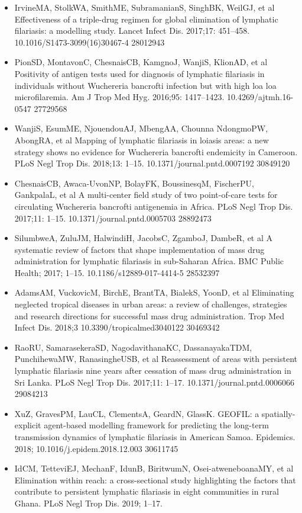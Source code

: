 \documentclass[11pt,a4paper]{article}
\begin{document}
\begin{itemize}
\item IrvineMA, StolkWA, SmithME, SubramanianS, SinghBK, WeilGJ, et al Effectiveness of a triple-drug regimen for global elimination of lymphatic filariasis: a modelling study. Lancet Infect Dis. 2017;17: 451–458. 10.1016/S1473-3099(16)30467-4 28012943
\item PionSD, MontavonC, ChesnaisCB, KamgnoJ, WanjiS, KlionAD, et al Positivity of antigen tests used for diagnosis of lymphatic filariasis in individuals without Wuchereria bancrofti infection but with high loa loa microfilaremia. Am J Trop Med Hyg. 2016;95: 1417–1423. 10.4269/ajtmh.16-0547 27729568
\item WanjiS, EsumME, NjouendouAJ, MbengAA, Chounna NdongmoPW, AbongRA, et al Mapping of lymphatic filariasis in loiasis areas: a new strategy shows no evidence for Wuchereria bancrofti endemicity in Cameroon. PLoS Negl Trop Dis. 2018;13: 1–15. 10.1371/journal.pntd.0007192 30849120
\item ChesnaisCB, Awaca-UvonNP, BolayFK, BoussinesqM, FischerPU, GankpalaL, et al A multi-center field study of two point-of-care tests for circulating Wuchereria bancrofti antigenemia in Africa. PLoS Negl Trop Dis. 2017;11: 1–15. 10.1371/journal.pntd.0005703 28892473
\item SilumbweA, ZuluJM, HalwindiH, JacobsC, ZgamboJ, DambeR, et al A systematic review of factors that shape implementation of mass drug administration for lymphatic filariasis in sub-Saharan Africa. BMC Public Health; 2017; 1–15. 10.1186/s12889-017-4414-5 28532397
\item AdamsAM, VuckovicM, BirchE, BrantTA, BialekS, YoonD, et al Eliminating neglected tropical diseases in urban areas: a review of challenges, strategies and research directions for successful mass drug administration. Trop Med Infect Dis. 2018;3 10.3390/tropicalmed3040122 30469342
\item RaoRU, SamarasekeraSD, NagodavithanaKC, DassanayakaTDM, PunchihewaMW, RanasingheUSB, et al Reassessment of areas with persistent lymphatic filariasis nine years after cessation of mass drug administration in Sri Lanka. PLoS Negl Trop Dis. 2017;11: 1–17. 10.1371/journal.pntd.0006066 29084213
\item XuZ, GravesPM, LauCL, ClementsA, GeardN, GlassK. GEOFIL: a spatially-explicit agent-based modelling framework for predicting the long-term transmission dynamics of lymphatic filariasis in American Samoa. Epidemics. 2018; 10.1016/j.epidem.2018.12.003 30611745
\item IdCM, TetteviEJ, MechanF, IdunB, BiritwumN, Osei-atweneboanaMY, et al Elimination within reach: a cross-sectional study highlighting the factors that contribute to persistent lymphatic filariasis in eight communities in rural Ghana. PLoS Negl Trop Dis. 2019; 1–17.

\end{itemize}
\end{document}
